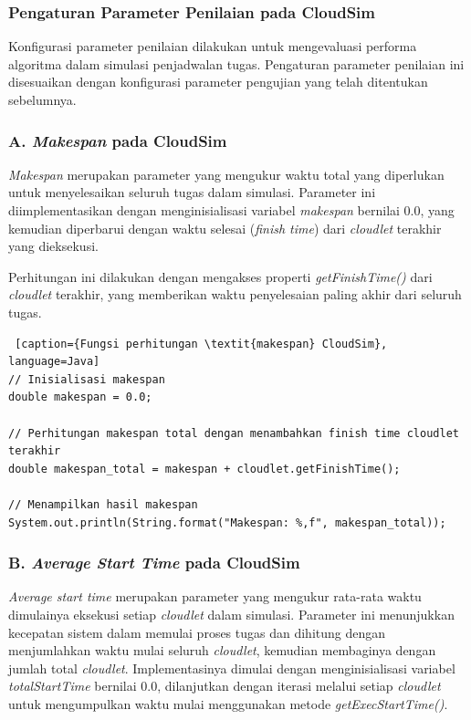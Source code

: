 \subsubsection{Pengaturan Parameter Penilaian pada CloudSim}
Konfigurasi parameter penilaian dilakukan untuk mengevaluasi performa algoritma dalam simulasi penjadwalan tugas. Pengaturan parameter penilaian ini disesuaikan dengan konfigurasi parameter pengujian yang telah ditentukan sebelumnya.

\subsubsection{A. \textit{Makespan} pada CloudSim}
\textit{Makespan} merupakan parameter yang mengukur waktu total yang diperlukan untuk menyelesaikan seluruh tugas dalam simulasi. Parameter ini diimplementasikan dengan menginisialisasi variabel \textit{makespan} bernilai 0.0, yang kemudian diperbarui dengan waktu selesai (\textit{finish time}) dari \textit{cloudlet} terakhir yang dieksekusi.

Perhitungan ini dilakukan dengan mengakses properti \textit{getFinishTime()} dari \textit{cloudlet} terakhir, yang memberikan waktu penyelesaian paling akhir dari seluruh tugas.

\begin{lstlisting} [caption={Fungsi perhitungan \textit{makespan} CloudSim}, language=Java]
// Inisialisasi makespan
double makespan = 0.0;

// Perhitungan makespan total dengan menambahkan finish time cloudlet terakhir
double makespan_total = makespan + cloudlet.getFinishTime();

// Menampilkan hasil makespan
System.out.println(String.format("Makespan: %,f", makespan_total));
\end{lstlisting}

\subsubsection{B. \textit{Average Start Time} pada CloudSim}
\textit{Average start time} merupakan parameter yang mengukur rata-rata waktu dimulainya eksekusi setiap \textit{cloudlet} dalam simulasi. Parameter ini menunjukkan kecepatan sistem dalam memulai proses tugas dan dihitung dengan menjumlahkan waktu mulai seluruh \textit{cloudlet}, kemudian membaginya dengan jumlah total \textit{cloudlet}. Implementasinya dimulai dengan menginisialisasi variabel \textit{totalStartTime} bernilai 0.0, dilanjutkan dengan iterasi melalui setiap \textit{cloudlet} untuk mengumpulkan waktu mulai menggunakan metode \textit{getExecStartTime()}.

